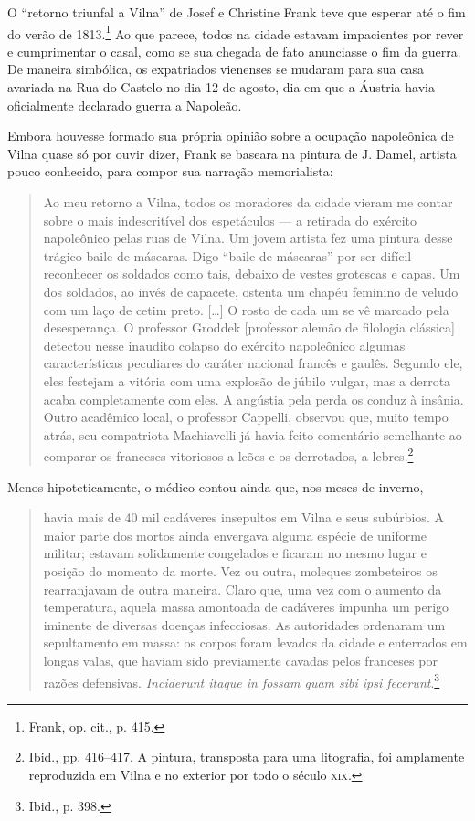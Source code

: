 \asterisc

O ``retorno triunfal a Vilna'' de Josef e Christine Frank teve que
esperar até o fim do verão de 1813.\footnote{Frank, op. cit., p. 415.}
Ao que parece, todos na cidade estavam impacientes por rever e
cumprimentar o casal, como se sua chegada de fato anunciasse o fim da
guerra. De maneira simbólica, os expatriados vienenses se mudaram para
sua casa avariada na Rua do Castelo no dia 12 de agosto, dia em que a
Áustria havia oficialmente declarado guerra a Napoleão.

Embora houvesse formado sua própria opinião sobre a ocupação napoleônica
de Vilna quase só por ouvir dizer, Frank se baseara na pintura de J.
Damel, artista pouco conhecido, para compor sua narração memorialista:

\begin{quote}
Ao meu retorno a Vilna, todos os moradores da cidade vieram me contar
sobre o mais indescritível dos espetáculos --- a retirada do exército
napoleônico pelas ruas de Vilna. Um jovem artista fez uma pintura desse
trágico baile de máscaras. Digo ``baile de máscaras'' por ser difícil
reconhecer os soldados como tais, debaixo de vestes grotescas e capas.
Um dos soldados, ao invés de capacete, ostenta um chapéu feminino de
veludo com um laço de cetim preto. [\ldots{}] O rosto de cada um se vê
marcado pela desesperança. O professor Groddek {[}professor alemão de
filologia clássica{]} detectou nesse inaudito colapso do exército
napoleônico algumas características peculiares do caráter nacional
francês e gaulês. Segundo ele, eles festejam a vitória com uma explosão
de júbilo vulgar, mas a derrota acaba completamente com eles. A angústia
pela perda os conduz à insânia. Outro acadêmico local, o professor
Cappelli, observou que, muito tempo atrás, seu compatriota Machiavelli
já havia feito comentário semelhante ao comparar os franceses vitoriosos
a leões e os derrotados, a lebres.\footnote{Ibid., pp. 416--417. A pintura, transposta para uma litografia, foi amplamente reproduzida em Vilna e no exterior por todo o século \textsc{xix}.} 
\end{quote}

Menos hipoteticamente, o médico contou ainda que, nos meses de inverno,

%

\begin{quote}
havia mais de 40 mil cadáveres insepultos em Vilna e seus subúrbios. A
maior parte dos mortos ainda envergava alguma espécie de uniforme
militar; estavam solidamente congelados e ficaram no mesmo lugar e
posição do momento da morte. Vez ou outra, moleques zombeteiros os
rearranjavam de outra maneira. Claro que, uma vez com o aumento da
temperatura, aquela massa amontoada de cadáveres impunha um perigo
iminente de diversas doenças infecciosas. As autoridades ordenaram um
sepultamento em massa: os corpos foram levados da cidade e enterrados em
longas valas, que haviam sido previamente cavadas pelos franceses por
razões defensivas. \textit{Inciderunt itaque in fossam quam sibi ipsi
fecerunt}.\footnote{Ibid., p. 398.}
\end{quote}

